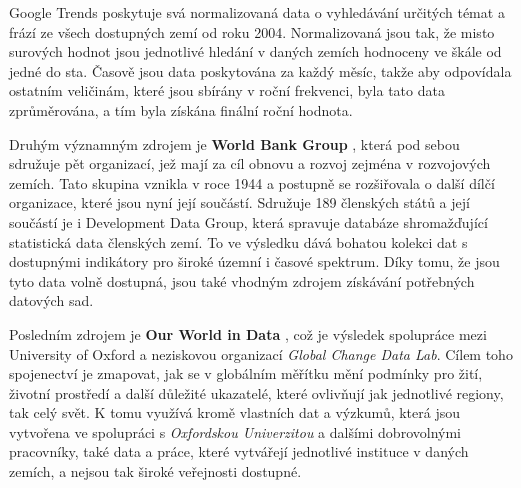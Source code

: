 \documentclass[thesis=M,czech]{FITthesis}[2022/10/08]
\begin{document}
Google Trends poskytuje svá normalizovaná data o vyhledávání určitých témat a frází ze všech dostupných zemí od roku 2004. Normalizovaná jsou tak, že misto surových hodnot jsou jednotlivé hledání v daných zemích hodnoceny ve škále od jedné do sta. Časově jsou data poskytována za každý měsíc, takže aby odpovídala ostatním veličinám, které jsou sbírány v roční frekvenci, byla tato data zprůměrována, a tím byla získána finální roční hodnota.

Druhým významným zdrojem je \textbf{World Bank Group} \cite{worldbank}, která pod sebou sdružuje pět organizací, jež mají za cíl obnovu a rozvoj zejména v rozvojových zemích. Tato skupina vznikla v roce 1944 a postupně se rozšiřovala o další dílčí organizace, které jsou nyní její součástí. Sdružuje 189 členských států a její součástí je i Development Data Group, která spravuje databáze shromažďující statistická data členských zemí. To ve výsledku dává bohatou kolekci dat s dostupnými indikátory pro široké územní i časové spektrum. Díky tomu, že jsou tyto data volně dostupná, jsou také vhodným zdrojem získávání potřebných datových sad. 

Posledním zdrojem je \textbf{Our World in Data} \cite{OWD}, což je výsledek spolupráce mezi University of Oxford a neziskovou organizací \textit{Global Change Data Lab}. Cílem toho spojenectví je zmapovat, jak se v globálním měřítku mění podmínky pro žití, životní prostředí a další důležité ukazatelé, které ovlivňují jak jednotlivé regiony, tak celý svět. K tomu využívá kromě vlastních dat a výzkumů, která jsou vytvořena ve spolupráci s \textit{Oxfordskou Univerzitou} a dalšími dobrovolnými pracovníky, také data a práce, které vytvářejí jednotlivé instituce v daných zemích, a nejsou tak široké veřejnosti dostupné.
\end{document}
